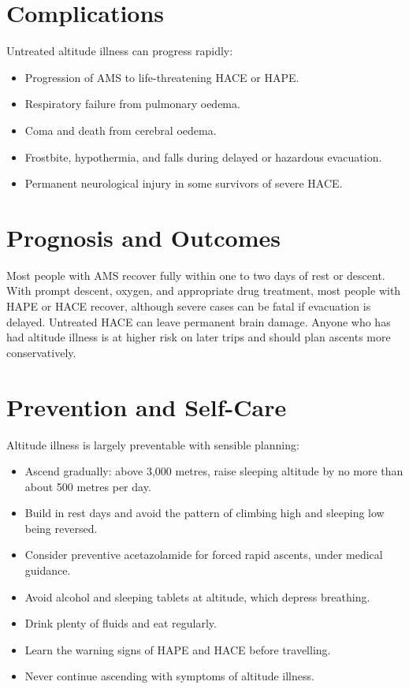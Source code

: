 \section*{Complications}
Untreated altitude illness can progress rapidly:

\begin{itemize}
    \item Progression of AMS to life-threatening HACE or HAPE.
    \item Respiratory failure from pulmonary oedema.
    \item Coma and death from cerebral oedema.
    \item Frostbite, hypothermia, and falls during delayed or hazardous evacuation.
    \item Permanent neurological injury in some survivors of severe HACE.
\end{itemize}

\section*{Prognosis and Outcomes}
Most people with AMS recover fully within one to two days of rest or descent. With prompt descent, oxygen, and appropriate drug treatment, most people with HAPE or HACE recover, although severe cases can be fatal if evacuation is delayed. Untreated HACE can leave permanent brain damage. Anyone who has had altitude illness is at higher risk on later trips and should plan ascents more conservatively.

\section*{Prevention and Self-Care}
Altitude illness is largely preventable with sensible planning:

\begin{itemize}
    \item Ascend gradually: above 3,000 metres, raise sleeping altitude by no more than about 500 metres per day.
    \item Build in rest days and avoid the pattern of climbing high and sleeping low being reversed.
    \item Consider preventive acetazolamide for forced rapid ascents, under medical guidance.
    \item Avoid alcohol and sleeping tablets at altitude, which depress breathing.
    \item Drink plenty of fluids and eat regularly.
    \item Learn the warning signs of HAPE and HACE before travelling.
    \item Never continue ascending with symptoms of altitude illness.
\end{itemize}

